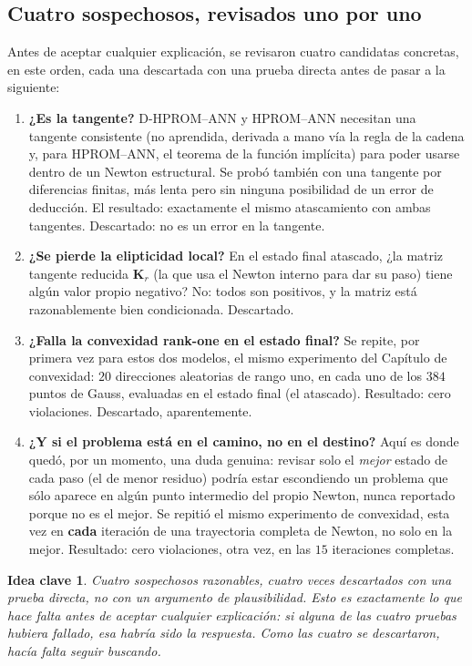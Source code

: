 \documentclass[11pt,a4paper]{article}
\newtheorem{takeaway}{Idea clave}
\begin{document}
\subsection{Cuatro sospechosos, revisados uno por uno}
\label{sec:appB-four-suspects}

Antes de aceptar cualquier explicaci\'on, se revisaron cuatro candidatas
concretas, en este orden, cada una descartada con una prueba directa
antes de pasar a la siguiente:

\begin{enumerate}
\item \textbf{¿Es la tangente?} D-HPROM--ANN y HPROM--ANN necesitan una
tangente consistente (no aprendida, derivada a mano v\'ia la regla de la
cadena y, para HPROM--ANN, el teorema de la funci\'on impl\'icita) para
poder usarse dentro de un Newton estructural. Se prob\'o tambi\'en con
una tangente por diferencias finitas, m\'as lenta pero sin ninguna
posibilidad de un error de deducci\'on. El resultado: exactamente el
mismo atascamiento con ambas tangentes. Descartado: no es un error en la
tangente.
\item \textbf{¿Se pierde la elipticidad local?} En el estado final
atascado, ¿la matriz tangente reducida $\mathbf K_r$ (la que usa el
Newton interno para dar su paso) tiene alg\'un valor propio negativo?
No: todos son positivos, y la matriz est\'a razonablemente bien
condicionada. Descartado.
\item \textbf{¿Falla la convexidad rank-one en el estado final?} Se
repite, por primera vez para estos dos modelos, el mismo experimento del
Cap\'itulo de convexidad: $20$ direcciones aleatorias de rango uno, en
cada uno de los $384$ puntos de Gauss, evaluadas en el estado final (el
atascado). Resultado: cero violaciones. Descartado, aparentemente.
\item \textbf{¿Y si el problema est\'a en el camino, no en el destino?}
Aqu\'i es donde qued\'o, por un momento, una duda genuina: revisar solo
el \emph{mejor} estado de cada paso (el de menor residuo) podr\'ia estar
escondiendo un problema que s\'olo aparece en alg\'un punto intermedio
del propio Newton, nunca reportado porque no es el mejor. Se repiti\'o
el mismo experimento de convexidad, esta vez en \textbf{cada} iteraci\'on
de una trayectoria completa de Newton, no solo en la mejor. Resultado:
cero violaciones, otra vez, en las $15$ iteraciones completas.
\end{enumerate}

\begin{takeaway}
Cuatro sospechosos razonables, cuatro veces descartados con una prueba
directa, no con un argumento de plausibilidad. Esto es exactamente lo
que hace falta antes de aceptar cualquier explicaci\'on: si alguna de
las cuatro pruebas hubiera fallado, esa habr\'ia sido la respuesta. Como
las cuatro se descartaron, hac\'ia falta seguir buscando.
\end{takeaway}
\end{document}
